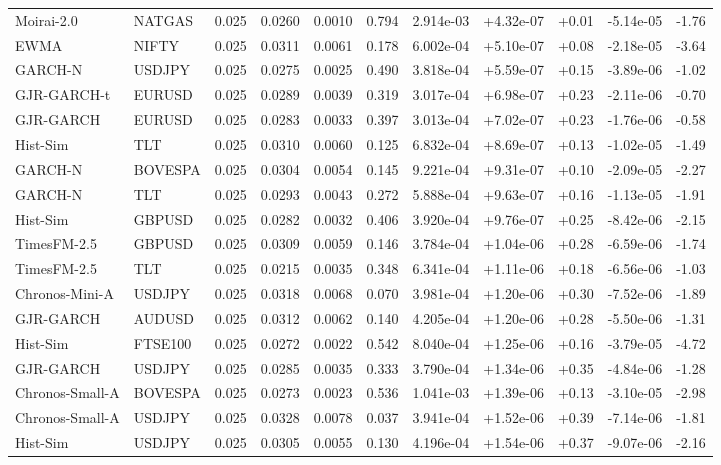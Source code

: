 \begin{tabular}{llrrrrrrrrr}
Moirai-2.0 & NATGAS & 0.025 & 0.0260 & 0.0010 & 0.794 & 2.914e-03 & +4.32e-07 & +0.01 & -5.14e-05 & -1.76 \\
EWMA & NIFTY & 0.025 & 0.0311 & 0.0061 & 0.178 & 6.002e-04 & +5.10e-07 & +0.08 & -2.18e-05 & -3.64 \\
GARCH-N & USDJPY & 0.025 & 0.0275 & 0.0025 & 0.490 & 3.818e-04 & +5.59e-07 & +0.15 & -3.89e-06 & -1.02 \\
GJR-GARCH-t & EURUSD & 0.025 & 0.0289 & 0.0039 & 0.319 & 3.017e-04 & +6.98e-07 & +0.23 & -2.11e-06 & -0.70 \\
GJR-GARCH & EURUSD & 0.025 & 0.0283 & 0.0033 & 0.397 & 3.013e-04 & +7.02e-07 & +0.23 & -1.76e-06 & -0.58 \\
Hist-Sim & TLT & 0.025 & 0.0310 & 0.0060 & 0.125 & 6.832e-04 & +8.69e-07 & +0.13 & -1.02e-05 & -1.49 \\
GARCH-N & BOVESPA & 0.025 & 0.0304 & 0.0054 & 0.145 & 9.221e-04 & +9.31e-07 & +0.10 & -2.09e-05 & -2.27 \\
GARCH-N & TLT & 0.025 & 0.0293 & 0.0043 & 0.272 & 5.888e-04 & +9.63e-07 & +0.16 & -1.13e-05 & -1.91 \\
Hist-Sim & GBPUSD & 0.025 & 0.0282 & 0.0032 & 0.406 & 3.920e-04 & +9.76e-07 & +0.25 & -8.42e-06 & -2.15 \\
TimesFM-2.5 & GBPUSD & 0.025 & 0.0309 & 0.0059 & 0.146 & 3.784e-04 & +1.04e-06 & +0.28 & -6.59e-06 & -1.74 \\
TimesFM-2.5 & TLT & 0.025 & 0.0215 & 0.0035 & 0.348 & 6.341e-04 & +1.11e-06 & +0.18 & -6.56e-06 & -1.03 \\
Chronos-Mini-A & USDJPY & 0.025 & 0.0318 & 0.0068 & 0.070 & 3.981e-04 & +1.20e-06 & +0.30 & -7.52e-06 & -1.89 \\
GJR-GARCH & AUDUSD & 0.025 & 0.0312 & 0.0062 & 0.140 & 4.205e-04 & +1.20e-06 & +0.28 & -5.50e-06 & -1.31 \\
Hist-Sim & FTSE100 & 0.025 & 0.0272 & 0.0022 & 0.542 & 8.040e-04 & +1.25e-06 & +0.16 & -3.79e-05 & -4.72 \\
GJR-GARCH & USDJPY & 0.025 & 0.0285 & 0.0035 & 0.333 & 3.790e-04 & +1.34e-06 & +0.35 & -4.84e-06 & -1.28 \\
Chronos-Small-A & BOVESPA & 0.025 & 0.0273 & 0.0023 & 0.536 & 1.041e-03 & +1.39e-06 & +0.13 & -3.10e-05 & -2.98 \\
Chronos-Small-A & USDJPY & 0.025 & 0.0328 & 0.0078 & 0.037 & 3.941e-04 & +1.52e-06 & +0.39 & -7.14e-06 & -1.81 \\
Hist-Sim & USDJPY & 0.025 & 0.0305 & 0.0055 & 0.130 & 4.196e-04 & +1.54e-06 & +0.37 & -9.07e-06 & -2.16 \\

\end{tabular}
